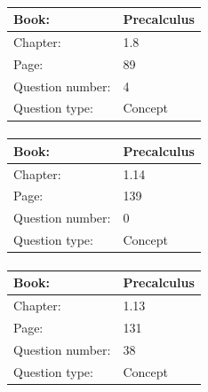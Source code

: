 \documentclass{article}
\begin{document}
            \paragraph{}
            \begin{tabularx}{1\textwidth}{
                    p{}
                    p{}
                }
                \toprule
                Book: & Precalculus
                \\
                \midrule
                Chapter: & 1.8
                \\
                \midrule
                Page: & 89
                \\
                \midrule
                Question number: & 4
                \\
                \midrule
                Question type: & Concept
                \\
                \bottomrule
            \end{tabularx}
            
            \paragraph{}
            \begin{tabularx}{1\textwidth}{
                    p{}
                    p{}
                }
                \toprule
                Book: & Precalculus
                \\
                \midrule
                Chapter: & 1.14
                \\
                \midrule
                Page: & 139
                \\
                \midrule
                Question number: & 0
                \\
                \midrule
                Question type: & Concept
                \\
                \bottomrule
            \end{tabularx}
            
            \paragraph{}
            \begin{tabularx}{1\textwidth}{
                    p{}
                    p{}
                }
                \toprule
                Book: & Precalculus
                \\
                \midrule
                Chapter: & 1.13
                \\
                \midrule
                Page: & 131
                \\
                \midrule
                Question number: & 38
                \\
                \midrule
                Question type: & Concept
                \\
                \bottomrule
            \end{tabularx}
            
\end{document}
